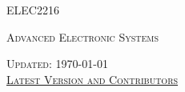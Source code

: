 \documentclass[a4paper,11pt]{article}
\begin{document}

\begin{center}
    {\scshape\huge ELEC2216\par} \vspace{0.5cm}
    {\scshape\Large Advanced Electronic Systems\par} \vspace{2cm}
    {\scshape Updated: \today \\ \href{https://github.com/Southampton-EEE/ELEC2216-Advanced-Electronic-Systems/graphs/contributors}{Latest Version and Contributors}}
\end{center}
\pagebreak

\tableofcontents \pagebreak





\end{document}
